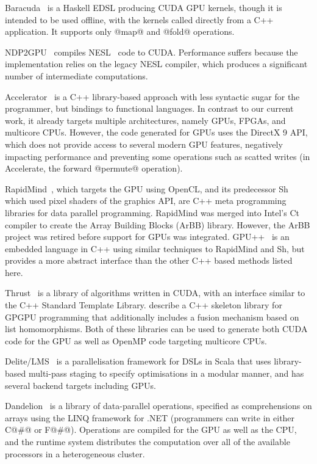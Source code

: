 Baracuda~\cite{Larsen:2011fa} is a Haskell EDSL producing CUDA GPU kernels,
though it is intended to be used offline, with the kernels called directly from
a C++ application. It supports only @map@ and @fold@ operations.

NDP2GPU~\cite{Bergstrom:2012bi} compiles NESL~\cite{Blelloch:1995ut} code to
CUDA. Performance suffers because the implementation relies on the legacy NESL
compiler, which produces a significant number of intermediate computations.



Accelerator~\cite{Bond:2010bd,Tarditi:2006} is a C++ library-based approach with
less syntactic sugar for the programmer, but bindings to functional languages.
In contrast to our current work, it already targets multiple architectures,
namely GPUs, FPGAs, and multicore CPUs. However, the code generated for GPUs
uses the DirectX 9 API, which does not provide access to several modern GPU
features, negatively impacting performance and preventing some operations such
as scatted writes (in Accelerate, the forward @permute@ operation).

RapidMind~\cite{LinXu:2008ig}, which targets the GPU using OpenCL, and its
predecessor Sh~\cite{McCool:2004,McCool:2004un} which used pixel shaders of the
graphics API, are C++ meta programming libraries for data parallel programming.
RapidMind was merged into Intel's Ct compiler to create the Array Building
Blocks (ArBB) library. However, the ArBB project was retired before support for
GPUs was integrated. GPU++~\cite{Jansen:2008vw} is an embedded language in C++
using similar techniques to RapidMind and Sh, but provides a more abstract
interface than the other C++ based methods listed here.

Thrust~\cite{ThrustAParallelT:ub} is a library of algorithms written in CUDA,
with an interface similar to the C++ Standard Template Library.
\citet{Sato:2009cq} describe a C++ skeleton library for GPGPU programming that
additionally includes a fusion mechanism based on list homomorphisms. Both of
these libraries can be used to generate both CUDA code for the GPU as well as
OpenMP code targeting multicore CPUs.



Delite/LMS~\cite{Rompf:2013er} is a parallelisation framework for DSLs in Scala
that uses library-based multi-pass staging to specify optimisations in a modular
manner, and has several backend targets including GPUs.

Dandelion~\cite{Rossbach:2013bj} is a library of data-parallel operations,
specified as comprehensions on arrays using the LINQ framework for .NET
(programmers can write in either C@#@ or F@#@). Operations are compiled for the
GPU as well as the CPU, and the runtime system distributes the computation over
all of the available processors in a heterogeneous cluster.


